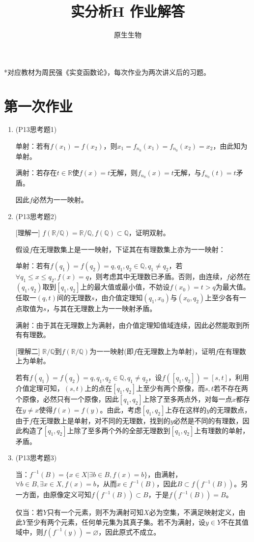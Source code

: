 \documentclass[a4paper,UTF8,fontset=windows]{ctexart}
\title{实分析H 作业解答}
\author{原生生物}
\date{}
\begin{document}
\maketitle
*对应教材为周民强《实变函数论》，每次作业为两次讲义后的习题。

\tableofcontents
\newpage
\section{第一次作业}
\begin{enumerate}
    \item (P13思考题1)
    
    单射：若有$f(x_1)=f(x_2)$，则$x_1=f_{n_0}(x_1)=f_{n_0}(x_2)=x_2$，由此知为单射。
    
    满射：若存在$t\in\mathbb{R}$使$f(x)=t$无解，则$f_{n_0}(x)=t$无解，与$f_{n_0}(t)=t$矛盾。
    
    因此$f$必然为一一映射。
    
    \item (P13思考题2)
    
    [理解一] $f(\mathbb{R}/\mathbb{Q})=\mathbb{R}/\mathbb{Q},f(\mathbb{Q})\subset\mathbb{Q}$，证明双射。
    
    假设$f$在无理数集上是一一映射，下证其在有理数集上亦为一一映射：
    
    单射：若有$f(q_1)=f(q_2)=q,q_1,q_2\in\mathbb{Q},q_1\ne q_2$，若$\forall q_1\le x\le q_2,f(x) = q$，则考虑其中无理数已矛盾。否则，由连续，$f$必然在$(q_1,q_2)$取到$[q_1,q_2]$上的最大值或最小值，不妨设$f(x_0)=t>q$为最大值。任取一$(q,t)$间的无理数$s$，由介值定理知$(q_1,x_0)$与$(x_0,q_2)$上至少各有一点取值为$s$，与其在无理数上为一一映射矛盾。
    
    满射：由于其在无理数上为满射，由介值定理知值域连续，因此必然能取到所有有理数。
    
    [理解二] $\mathbb{R}/\mathbb{Q}$到$f(\mathbb{R}/\mathbb{Q})$为一一映射(即$f$在无理数上为单射)，证明$f$在有理数上为单射。
    
    若有$f(q_1)=f(q_2)=q,q_1,q_2\in\mathbb{Q},q_1\ne q_2$，设$f([q_1,q_2])=[s,t]$，利用介值定理可知，$(s,t)$上的点在$[q_1,q_2]$上至少有两个原像，而$s,t$若不存在两个原像，必然只有一个原像，因此$[q_1,q_2]$上除了至多两点外，对每一点$x$都存在$y\ne x$使得$f(x)=f(y)$。由此，考虑$[q_1,q_2]$上存在这样的$y$的无理数点，由于$f$在无理数上是单射，对不同的无理数，找到的$y$必然是不同的有理数，因此构造了$[q_1,q_2]$上除了至多两个外的全部无理数到$[q_1,q_2]$上有理数的单射，矛盾。
    
    \item (P13思考题3)
    
    当：$f^{-1}(B)=\{x\in X|\exists b\in B, f(x) = b\}$，由满射，$\forall b\in B,\exists x\in X, f(x) = b$，从而$x\in f^{-1}(B)$，因此$B\subset f(f^{-1}(B))$。另一方面，由原像定义可知$f(f^{-1}(B))\subset B$，于是$f(f^{-1}(B))=B$。
    
    仅当：若$Y$只有一个元素，则不为满射可知$X$必为空集，不满足映射定义，由此$Y$至少有两个元素，任何单元集为其真子集。若不为满射，设$y\in Y$不在其值域中，则$f(f^{-1}({y}))=\varnothing$，因此原式不成立。
\end{enumerate}
\end{document}
